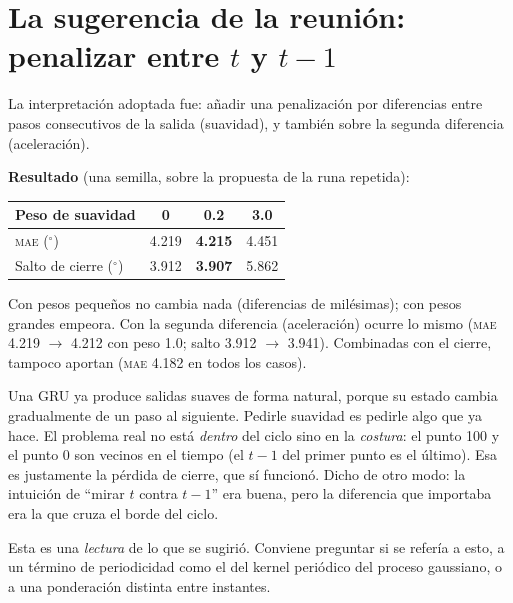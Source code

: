\documentclass[11pt,a4paper]{article}
\newcommand{\gr}{$^\circ$}
\newcommand{\mae}{\textsc{mae}}
\begin{document}
\section{La sugerencia de la reunión: penalizar entre $t$ y $t-1$}
\label{sec:suavidad}

La interpretación adoptada fue: añadir una penalización por diferencias entre pasos consecutivos de la salida (suavidad), y también sobre la segunda diferencia (aceleración).

\textbf{Resultado} (una semilla, sobre la propuesta de la runa repetida):

\begin{center}
\begin{tabular}{lccc}
\toprule
Peso de suavidad & 0 & 0.2 & 3.0 \\
\midrule
\mae{} (\gr) & 4.219 & \textbf{4.215} & 4.451 \\
Salto de cierre (\gr) & 3.912 & \textbf{3.907} & 5.862 \\
\bottomrule
\end{tabular}
\end{center}

Con pesos pequeños no cambia nada (diferencias de milésimas); con pesos grandes empeora. Con la segunda diferencia (aceleración) ocurre lo mismo (\mae{} 4.219 $\to$ 4.212 con peso 1.0; salto 3.912 $\to$ 3.941). Combinadas con el cierre, tampoco aportan (\mae{} 4.182 en todos los casos).

\begin{intuicion}
Una GRU ya produce salidas suaves de forma natural, porque su estado cambia gradualmente de un paso al siguiente. Pedirle suavidad es pedirle algo que ya hace. El problema real no está \emph{dentro} del ciclo sino en la \emph{costura}: el punto 100 y el punto 0 son vecinos en el tiempo (el $t-1$ del primer punto es el último). Esa es justamente la pérdida de cierre, que sí funcionó. Dicho de otro modo: la intuición de ``mirar $t$ contra $t-1$'' era buena, pero la diferencia que importaba era la que cruza el borde del ciclo.
\end{intuicion}

\begin{cuidado}
Esta es una \emph{lectura} de lo que se sugirió. Conviene preguntar si se refería a esto, a un término de periodicidad como el del kernel periódico del proceso gaussiano, o a una ponderación distinta entre instantes.
\end{cuidado}
\end{document}
